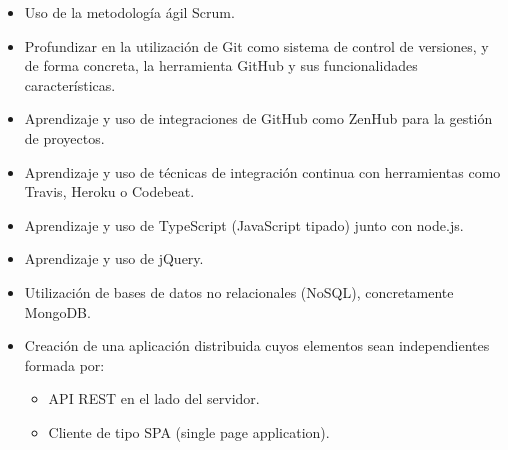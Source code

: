 \begin{itemize}
	\item Uso de la metodología ágil Scrum.
	\item Profundizar en la utilización de Git como sistema de control de versiones, y de forma concreta, la herramienta GitHub y sus funcionalidades características.
	\item Aprendizaje y uso de integraciones de GitHub como ZenHub para la gestión de proyectos.
	\item Aprendizaje y uso de técnicas de integración continua con herramientas como Travis, Heroku o Codebeat.
	\item Aprendizaje y uso de TypeScript (JavaScript tipado) junto con node.js.
	\item Aprendizaje y uso de jQuery.
	\item Utilización de bases de datos no relacionales (NoSQL), concretamente MongoDB.
	\item Creación de una aplicación distribuida cuyos elementos sean independientes formada por:
	
	\begin{itemize}
		\item API REST en el lado del servidor.
		\item Cliente de tipo SPA (single page application).
	\end{itemize}
\end{itemize}
